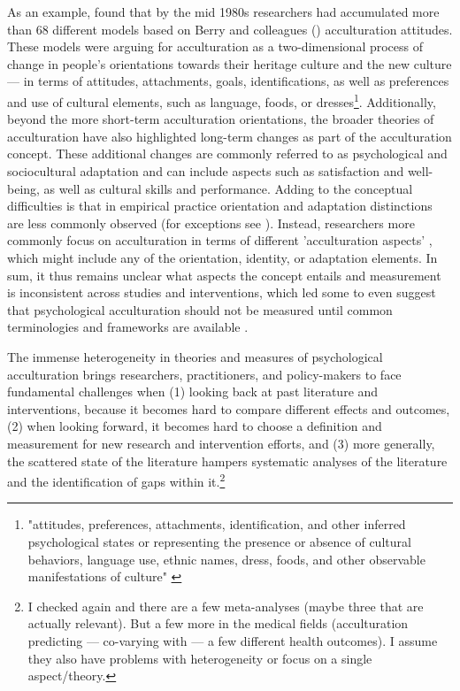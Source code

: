 \documentclass[nobib]{tufte-handout}
\begin{document}
As an example, \citet{Rudmin2003a} found that by the mid 1980s researchers had accumulated more than 68 different models based on Berry and colleagues (\citeyear{Berry1997b, Berry2003}) acculturation attitudes. These models were arguing for acculturation as a two-dimensional process of change in people's orientations towards their heritage culture and the new culture --- in terms of attitudes, attachments, goals, identifications, as well as preferences and use of cultural elements, such as language, foods, or dresses\footnote{"attitudes, preferences, attachments, identification, and other inferred psychological states or representing the presence or absence of cultural behaviors, language use, ethnic names, dress, foods, and other observable manifestations of culture" \citep[][p. 3]{Rudmin2003a}}. Additionally, beyond the more short-term acculturation orientations, the broader theories of acculturation have also highlighted long-term changes as part of the acculturation concept. These additional changes are commonly referred to as psychological and sociocultural adaptation \citep{Searle1990, Ward2001, Berry2003} and can include aspects such as satisfaction and well-being, as well as cultural skills and performance. Adding to the conceptual difficulties is that in empirical practice orientation and adaptation distinctions are less commonly observed (for exceptions see \citealp{ICSEYteam2006, Berry2006b, TeLindert2008a}). Instead, researchers more commonly focus on acculturation in terms of different 'acculturation aspects' \citep{Arends-Toth2006a}, which might include any of the orientation, identity, or adaptation elements. In sum, it thus remains unclear what aspects the concept entails and measurement is inconsistent across studies and interventions, which led some to even suggest that psychological acculturation should not be measured until common terminologies and frameworks are available \citep{Escobar2000}.

 The immense heterogeneity in theories and measures of psychological acculturation brings researchers, practitioners, and policy-makers to face fundamental challenges when (1) looking back at past literature and interventions, because it becomes hard to compare different effects and outcomes, (2) when looking forward, it becomes hard to choose a definition and measurement for new research and intervention efforts, and (3) more generally, the scattered state of the literature hampers systematic analyses of the literature and the identification of gaps within it.\footnote{I checked again and there are a few meta-analyses (maybe three that are actually relevant). But a few more in the medical fields (acculturation predicting --- co-varying with --- a few different health outcomes). I assume they also have problems with heterogeneity or focus on a single aspect/theory.}
\end{document}
